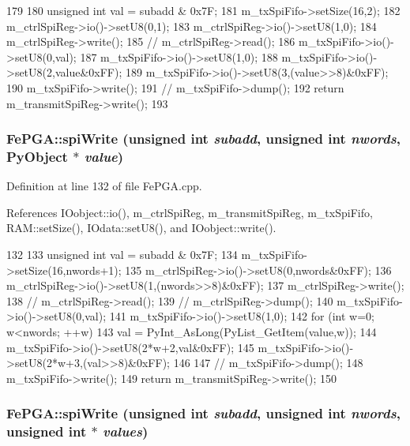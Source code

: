 \begin{DoxyCode}
179                                                                  {
180   unsigned int val = subadd & 0x7F;
181   m_txSpiFifo->setSize(16,2);
182   m_ctrlSpiReg->io()->setU8(0,1);
183   m_ctrlSpiReg->io()->setU8(1,0);
184   m_ctrlSpiReg->write();
185   //  m_ctrlSpiReg->read();
186   m_txSpiFifo->io()->setU8(0,val);
187   m_txSpiFifo->io()->setU8(1,0);
188   m_txSpiFifo->io()->setU8(2,value&0xFF);
189   m_txSpiFifo->io()->setU8(3,(value>>8)&0xFF);
190   m_txSpiFifo->write();
191   //  m_txSpiFifo->dump();
192   return m_transmitSpiReg->write();
193 }
\end{DoxyCode}
\hypertarget{classFePGA_aa6aebdd1ccb236f9009a29243f3c7c2b}{
\subsubsection[{spiWrite}]{ FePGA::spiWrite (unsigned int {\em subadd}, \/  unsigned int {\em nwords}, \/  PyObject $\ast$ {\em value})}}
\label{classFePGA_aa6aebdd1ccb236f9009a29243f3c7c2b}


Definition at line 132 of file FePGA.cpp.

References IOobject::io(), m\_\-ctrlSpiReg, m\_\-transmitSpiReg, m\_\-txSpiFifo, RAM::setSize(), IOdata::setU8(), and IOobject::write().


\begin{DoxyCode}
132                                                                                  
        {
133   unsigned int val = subadd & 0x7F; 
134   m_txSpiFifo->setSize(16,nwords+1);
135   m_ctrlSpiReg->io()->setU8(0,nwords&0xFF);
136   m_ctrlSpiReg->io()->setU8(1,(nwords>>8)&0xFF);
137   m_ctrlSpiReg->write();
138   //  m_ctrlSpiReg->read();
139   //  m_ctrlSpiReg->dump();
140   m_txSpiFifo->io()->setU8(0,val);
141   m_txSpiFifo->io()->setU8(1,0);
142   for (int w=0; w<nwords; ++w) {
143     val = PyInt_AsLong(PyList_GetItem(value,w));
144     m_txSpiFifo->io()->setU8(2*w+2,val&0xFF);
145     m_txSpiFifo->io()->setU8(2*w+3,(val>>8)&0xFF);
146   }
147   //  m_txSpiFifo->dump();
148   m_txSpiFifo->write();
149   return m_transmitSpiReg->write();
150 }
\end{DoxyCode}
\hypertarget{classFePGA_ac3e8b10fc267b44fef1e651cab77d2ab}{
\subsubsection[{spiWrite}]{ FePGA::spiWrite (unsigned int {\em subadd}, \/  unsigned int {\em nwords}, \/  unsigned int $\ast$ {\em values})}}
\label{classFePGA_ac3e8b10fc267b44fef1e651cab77d2ab}


